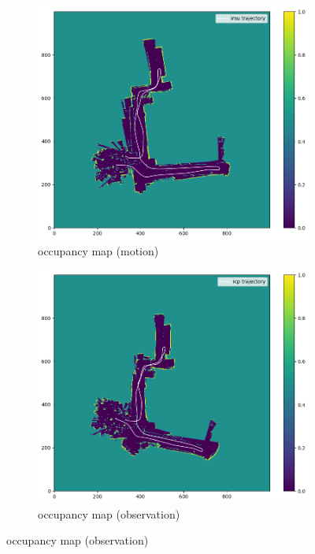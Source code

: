 \documentclass[conference]{IEEEtran}
\begin{document}
\begin{figure}[htbp]
    \begin{subfigure}{0.24\textwidth}
        \includegraphics[width=\linewidth]{../img/omap_20_imu.png}
        \caption{occupancy map (motion)}
        \label{fig:omap_20_imu}
    \end{subfigure}
    \hfill
    \begin{subfigure}{0.24\textwidth}
        \includegraphics[width=\linewidth]{../img/omap_20_icp.png}
        \caption{occupancy map (observation)}

\end{subfigure}
\end{figure}
\end{document}
